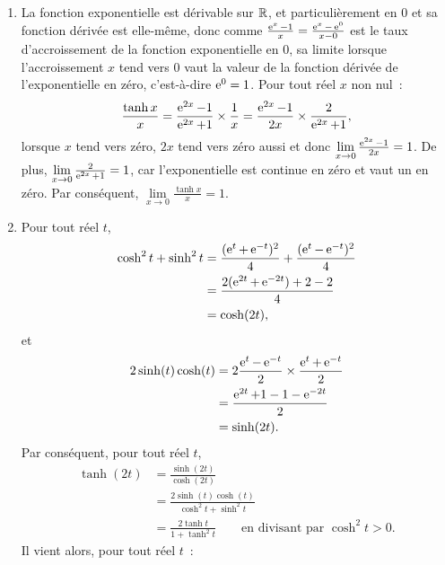 \begin{corrige}
  \begin{enumerate}
    \item La fonction exponentielle est dérivable sur \(\mathbb{R}\), et 
      particulièrement en \(0\) et sa fonction dérivée est elle-même, donc comme 
      \(\frac{\operatorname{e}^x-1}{x} = \frac{\operatorname{e}^x-\operatorname{e}^0}{x-0}\) est le taux d'accroissement 
      de la fonction exponentielle en \(0\), sa limite lorsque l'accroissement 
      \(x\) tend vers \(0\) vaut la valeur de la fonction dérivée de 
      l'exponentielle en zéro, c'est-à-dire \(\operatorname{e}^0 = 1\).
      Pour tout réel \(x\) non nul~:
      \begin{equation*}
        \frac{\tanh x}{x} = \frac{\operatorname{e}^{2x}-1}{\operatorname{e}^{2x}+1} \times \frac{1}{x} = 
        \frac{\operatorname{e}^{2x}-1}{2x} \times \frac{2}{\operatorname{e}^{2x}+1},
      \end{equation*}
      lorsque \(x\) tend vers zéro, \(2x\) tend vers zéro aussi et donc 
      \(\lim\limits_{x \to 0}\frac{\operatorname{e}^{2x}-1}{2x} = 1\). De plus, 
      \(\lim\limits_{x \to 0} \frac{2}{\operatorname{e}^{2x}+1} = 1\), car l'exponentielle est 
      continue en zéro et vaut un en zéro. Par conséquent, \(\lim\limits_{x \to 
      0} \frac{\tanh x}{x} = 1\).
    \item Pour tout réel \(t\),
      \begin{align*}
        \cosh^2 t + \sinh^2 t   &= \frac{(\operatorname{e}^t+\operatorname{e}^{-t})^2}{4} + 
        \frac{(\operatorname{e}^t-\operatorname{e}^{-t})^2}{4} \\
        &= \frac{2(\operatorname{e}^{2t}+\operatorname{e}^{-2t}) +2 -2}{4} \\
        &= \cosh(2t),
      \end{align*}
      et
      \begin{align*}
        2\sinh(t)\cosh(t)   &= 2 \frac{\operatorname{e}^t - \operatorname{e}^{-t}}{2} \times \frac{\operatorname{e}^t + 
        \operatorname{e}^{-t}}{2} \\
        &= \frac{\operatorname{e}^{2t}+1-1-\operatorname{e}^{-2t}}{2} \\
        &= \sinh(2t).
      \end{align*}
      Par conséquent, pour tout réel \(t\),
      \begin{align*}
        \tanh(2t)   &= \frac{\sinh(2t)}{\cosh(2t)} \\
        &= \frac{2\sinh(t)\cosh(t)}{\cosh^2 t + \sinh^2 t} \\
        &= \frac{2\tanh t}{1+\tanh^2 t} \qquad \text{en divisant par~} \cosh^2 
        t>0.
      \end{align*}
      Il vient alors, pour tout réel \(t\)~:
      \begin{equation*}

\end{equation*}
\end{enumerate}
\end{corrige}
